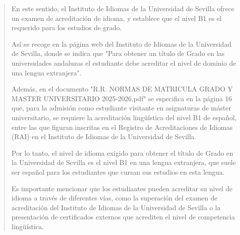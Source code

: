 \documentclass[12pt,a4paper,oneside]{report}
\begin{document}
\begin{itemize}
\begin{itemize}
\begin{quote}
En este sentido, el Instituto de Idiomas de la Universidad de Sevilla ofrece un examen de acreditación de idioma, y establece que el nivel B1 es el requerido para los estudios de grado. 

Así se recoge en la página web del Instituto de Idiomas de la Universidad de Sevilla, donde se indica que "Para obtener un título de Grado en las universidades andaluzas el estudiante debe acreditar el nivel de dominio de una lengua extranjera".

Además, en el documento "R.R. NORMAS DE MATRICULA GRADO Y MASTER UNIVERSITARIO 2025-2026.pdf" se especifica en la página 16 que, para la admisión como estudiante visitante en asignaturas de máster universitario, se requiere la acreditación lingüística del nivel B1 de español, entre las que figuran inscritas en el Registro de Acreditaciones de Idiomas (RAI) en el Instituto de Idiomas de la Universidad de Sevilla.

Por lo tanto, el nivel de idioma exigido para obtener el título de Grado en la Universidad de Sevilla es el nivel B1 en una lengua extranjera, que suele ser español para los estudiantes que cursan sus estudios en esta lengua. 

Es importante mencionar que los estudiantes pueden acreditar su nivel de idioma a través de diferentes vías, como la superación del examen de acreditación del Instituto de Idiomas de la Universidad de Sevilla o la presentación de certificados externos que acrediten el nivel de competencia lingüística. 


\end{quote}
\end{itemize}
\end{itemize}
\end{document}
